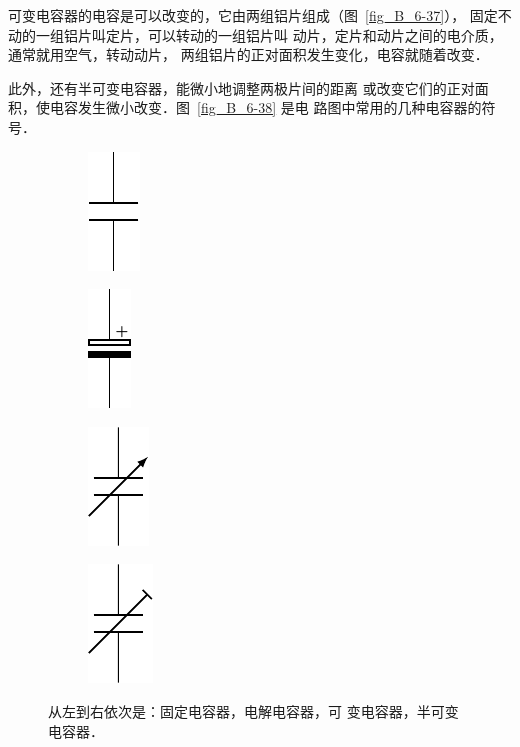 可变电容器的电容是可以改变的，它由两组铝片组成（图~\ref{fig_B_6-37}），
固定不动的一组铝片叫定片，可以转动的一组铝片叫
动片，定片和动片之间的电介质，通常就用空气，转动动片，
两组铝片的正对面积发生变化，电容就随着改变．

此外，还有半可变电容器，能微小地调整两极片间的距离
或改变它们的正对面积，使电容发生微小改变．图~\ref{fig_B_6-38} 是电
路图中常用的几种电容器的符号．

\begin{figure}[htbp]
    \centering
    \begin{subfigure}{0.2\linewidth}
        \centering
        \includegraphics{fig/B/6-38a.pdf}
        \caption{}\label{fig_B_6-38a}
    \end{subfigure}
    \hfil
    \begin{subfigure}{0.2\linewidth}
        \centering
        \includegraphics{fig/B/6-38b.pdf}
        \caption{}\label{fig_B_6-38b}
    \end{subfigure}
    \hfil
    \begin{subfigure}{0.2\linewidth}
        \centering
        \includegraphics{fig/B/6-38c.pdf}
        \caption{}\label{fig_B_6-38c}
    \end{subfigure}
    \hfil
    \begin{subfigure}{0.2\linewidth}
        \centering
        \includegraphics{fig/B/6-38d.pdf}
        \caption{}\label{fig_B_6-38d}
    \end{subfigure}
    \caption{从左到右依次是：固定电容器，电解电容器，可
    变电容器，半可变电容器．}
\end{figure}

